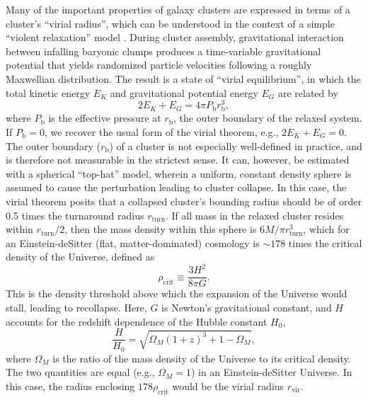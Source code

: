 Many of the important properties of galaxy clusters are expressed in terms of a
cluster's ``virial radius'', which can be understood in the context of a simple
``violent relaxation'' model \citep[e.g.,][]{lyndenbell67}. During cluster
assembly, gravitational interaction between infalling baryonic clumps produces
a time-variable gravitational potential that yields randomized particle
velocities following a roughly Maxwellian distribution. The result is a state of 
``virial equilibrium'', in which the total kinetic energy $E_K$ and gravitational 
potential energy $E_G$ are related by 
\begin{equation}
2 E_K + E_G = 4\pi P_\mathrm{b} r_\mathrm{b}^3,
\end{equation}
where $P_\mathrm{b}$ is the effective pressure at $r_\mathrm{b}$, the outer 
boundary of the relaxed system. If $P_\mathrm{b}=0$, we recover the usual 
form of the virial theorem, e.g., $2 E_K + E_G = 0$.   
The outer boundary ($r_\mathrm{b}$) of a cluster is not especially well-defined in practice,
and is therefore not measurable in the strictest sense. 
It can, however, be estimated with a spherical ``top-hat'' model, wherein  
a uniform, constant density sphere is assumed to cause the perturbation 
leading to cluster collapse. In this case, 
the virial theorem posits that a collapsed cluster's bounding radius should be 
of order 0.5 times the turnaround radius $r_\mathrm{turn}$. 
If all mass in the relaxed cluster resides within  $r_\mathrm{turn} / 2$, 
then the mass density within this sphere is $6 M / \pi r_\mathrm{turn}^3$, 
which for an Einstein-deSitter (flat, matter-dominated) cosmology 
is $\sim 178$ times the critical density of the Universe, defined as
\begin{equation}
\rho_\mathrm{crit} \equiv \frac{3 H^2 }{8\pi G}.  
\end{equation}
This is the density threshold above which the expansion of the Universe 
would stall, leading to recollapse. 
Here,  
$G$ is Newton's gravitational constant, and $H$ accounts for the redshift dependence of the Hubble constant $H_0$, 
\begin{equation}
\frac{H}{H_0} = \sqrt{\Omega_M \left(1+z\right)^3 + 1 - \Omega_M},
\label{equation:hubblescale}
\end{equation}
where $\Omega_M$ is the ratio of the mass density of the Universe to its critical density. The two quantities are equal (e.g., $\Omega_M=1 $) in an Einstein-deSitter Universe. In this case, the radius enclosing $178 \rho_\mathrm{crit}$ would 
be the virial radius $r_\mathrm{vir}$. 
